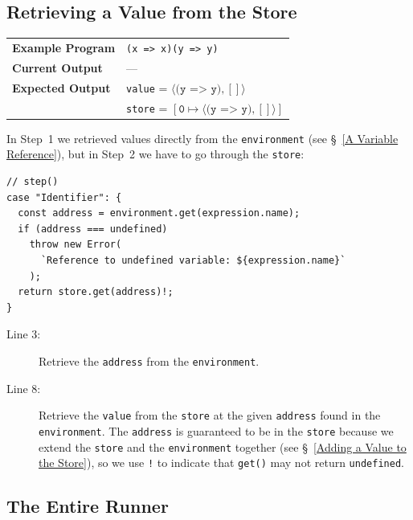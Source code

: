 \documentclass[12pt, oneside]{book}
\begin{document}
\subsection{Retrieving a Value from the Store}

\begin{center}
\begin{tabular}{ll}
\textbf{Example Program} & \texttt{(x => x)(y => y)} \\
\textbf{Current Output} & — \\
\textbf{Expected Output} & \texttt{value} = $\langle \texttt{(y => y)}, [] \rangle$ \\
& \texttt{store} = $[\texttt{0} \mapsto \langle \texttt{(y => y)}, [] \rangle]$ \\
\end{tabular}
\end{center}

In Step~1 we retrieved values directly from the \texttt{environment} (see §~\ref{A Variable Reference}), but in Step~2 we have to go through the \texttt{store}:

\begin{verbatim}
// step()
case "Identifier": {
  const address = environment.get(expression.name);
  if (address === undefined)
    throw new Error(
      `Reference to undefined variable: ${expression.name}`
    );
  return store.get(address)!;
}
\end{verbatim}

\begin{description}
\item [Line 3:]

Retrieve the \texttt{address} from the \texttt{environment}.

\item [Line 8:]

Retrieve the \texttt{value} from the \texttt{store} at the given \texttt{address} found in the \texttt{environment}. The \texttt{address} is guaranteed to be in the \texttt{store} because we extend the \texttt{store} and the \texttt{environment} together (see §~\ref{Adding a Value to the Store}), so we use \texttt{!} to indicate that \texttt{get()} may not return \texttt{undefined}.
\end{description}

\subsection{The Entire Runner}
\end{document}
